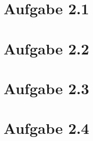 \documentclass{theozettel}
\begin{document}

\section*{Aufgabe 2.1}


\newpage
\section*{Aufgabe 2.2}


\newpage
\section*{Aufgabe 2.3}


\newpage
\section*{Aufgabe 2.4}
\end{document}
